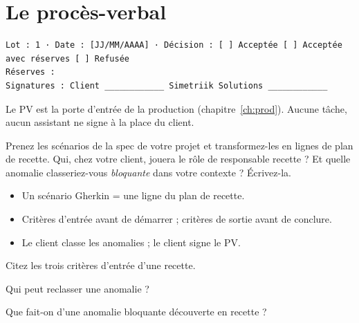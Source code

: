 \section{Le procès-verbal}
\begin{code}
\begin{Verbatim}
Lot : 1 · Date : [JJ/MM/AAAA] · Décision : [ ] Acceptée [ ] Acceptée avec réserves [ ] Refusée
Réserves :
Signatures : Client ____________ Simetriik Solutions ____________
\end{Verbatim}
\end{code}
Le PV est la porte d'entrée de la production (chapitre~\ref{ch:prod}). Aucune tâche, aucun assistant ne signe à la place du client.

\begin{vousjouez}
Prenez les scénarios de la spec de votre projet et transformez-les en lignes de plan de recette. Qui, chez votre client, jouera le
rôle de responsable recette ? Et quelle anomalie classeriez-vous \emph{bloquante} dans votre contexte ? Écrivez-la.
\end{vousjouez}

\begin{retenir}[À retenir]
\begin{itemize}
  \item Un scénario Gherkin = une ligne du plan de recette.
  \item Critères d'entrée avant de démarrer ; critères de sortie avant de conclure.
  \item Le client classe les anomalies ; le client signe le PV.
\end{itemize}
\end{retenir}

\begin{acquis}
  \item Citez les trois critères d'entrée d'une recette.
  \item Qui peut reclasser une anomalie ?
  \item Que fait-on d'une anomalie bloquante découverte en recette ?
\end{acquis}
